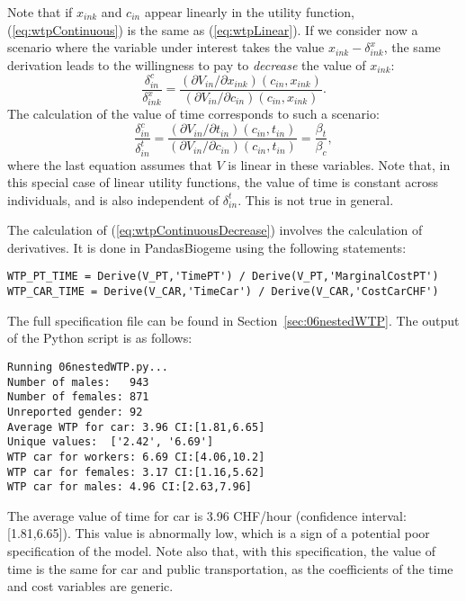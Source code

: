 \documentclass[12pt,a4paper]{article}
\newcommand{\req}[1]{(\ref{#1})}
\begin{document}
Note that if $x_{ink}$ and $c_{in}$ appear linearly in the utility
function, \req{eq:wtpContinuous} is the same as \req{eq:wtpLinear}.
If we consider now a scenario where the variable under interest takes the value
$x_{ink} - \delta^x_{ink}$, the same derivation leads to the
willingness to pay to \emph{decrease} the value of $x_{ink}$:
\begin{equation}
  \label{eq:wtpContinuousDecrease}
\frac{\delta^c_{in}}{ \delta^x_{ink}} = \frac{(\partial V_{in}/\partial x_{ink})(c_{in},x_{ink})}{(\partial V_{in}/\partial c_{in})(c_{in},x_{ink})}.
\end{equation}
The calculation of the value of time corresponds to such a scenario:
\begin{equation}
\frac{\delta^c_{in}}{ \delta^t_{in}} =  \frac{(\partial V_{in}/\partial t_{in})(c_{in},t_{in})}{(\partial V_{in}/\partial c_{in})(c_{in},t_{in})} = \frac{\beta_t}{\beta_c},
\end{equation}
where the last equation assumes that $V$ is linear in these variables.
Note that, in this special case of linear utility functions, the value
of time is constant across individuals, and is also independent of
$\delta^t_{in}$. This is not true in general.

The calculation of \req{eq:wtpContinuousDecrease} involves the
calculation of derivatives. It is done in PandasBiogeme using the
following statements:
\begin{lstlisting}
WTP_PT_TIME = Derive(V_PT,'TimePT') / Derive(V_PT,'MarginalCostPT')
WTP_CAR_TIME = Derive(V_CAR,'TimeCar') / Derive(V_CAR,'CostCarCHF')
\end{lstlisting}
The full specification file can be found in
Section~\ref{sec:06nestedWTP}.
The output of the Python script is as follows:
\begin{lstlisting}
Running 06nestedWTP.py...
Number of males:   943
Number of females: 871
Unreported gender: 92
Average WTP for car: 3.96 CI:[1.81,6.65]
Unique values:  ['2.42', '6.69']
WTP car for workers: 6.69 CI:[4.06,10.2]
WTP car for females: 3.17 CI:[1.16,5.62]
WTP car for males: 4.96 CI:[2.63,7.96]
\end{lstlisting}


The average value of time for car is 3.96 CHF/hour (confidence
interval: [1.81,6.65]). This value is abnormally low, which is a
sign of a potential poor specification of the model. 
Note also that, with this specification, the value of time is the same for
car and public transportation, as the coefficients of the time and
cost variables are generic.
\end{document}
